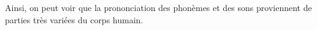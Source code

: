 \documentclass[12pt, french, twoside]{report}
\begin{document}
Ainsi, on peut voir que la prononciation des phonèmes et des sons proviennent de parties très variées du corps humain. 
\end{document}
